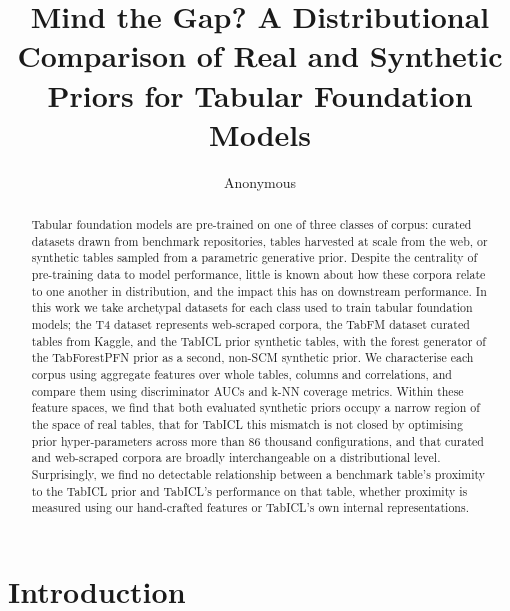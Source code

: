 \documentclass{article}
\title{Mind the Gap? A Distributional Comparison of Real and Synthetic Priors for Tabular Foundation Models}
\author{%
  Anonymous
}
\begin{document}
\maketitle


\begin{abstract}
Tabular foundation models are pre-trained on one of three classes of corpus: curated datasets drawn from benchmark repositories, tables harvested at scale from the web, or synthetic tables sampled from a parametric generative prior.
Despite the centrality of pre-training data to model performance, little is known about how these corpora relate to one another in distribution, and the impact this has on downstream performance.
In this work we take archetypal datasets for each class used to train tabular foundation models; the T4 dataset represents web-scraped corpora, the TabFM dataset curated tables from Kaggle, and the TabICL prior synthetic tables, with the forest generator of the TabForestPFN prior as a second, non-SCM synthetic prior.
We characterise each corpus using aggregate features over whole tables, columns and correlations, and compare them using discriminator AUCs and k-NN coverage metrics.
Within these feature spaces, we find that both evaluated synthetic priors occupy a narrow region of the space of real tables, that for TabICL this mismatch is not closed by optimising prior hyper-parameters across more than 86 thousand configurations, and that curated and web-scraped corpora are broadly interchangeable on a distributional level.
Surprisingly, we find no detectable relationship between a benchmark table's proximity to the TabICL prior and TabICL's performance on that table, whether proximity is measured using our hand-crafted features or TabICL's own internal representations.
\end{abstract}

\section{Introduction}
\label{sec:introduction}
\end{document}
